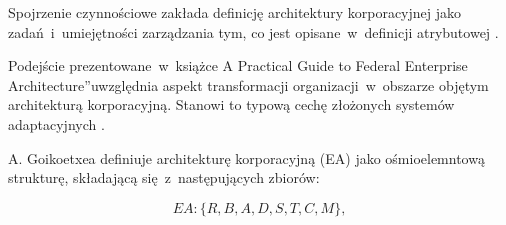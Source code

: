 Spojrzenie czynnościowe zakłada definicję architektury korporacyjnej jako zadań~i~umiejętności zarządzania tym, co jest opisane~w~definicji atrybutowej \cite{ArchKorpSzymSup}.

Podejście prezentowane~w~książce \quotedblbase A Practical Guide to Federal Enterprise Architecture\textquotedblright uwzględnia aspekt transformacji organizacji~w~obszarze objętym architekturą korporacyjną. Stanowi to typową cechę złożonych systemów adaptacyjnych \cite{ArchKorpSob}.

A. Goikoetxea definiuje architekturę korporacyjną (EA) jako ośmioelemntową strukturę, składającą się~z~następujących zbiorów:

\begin{center}
\begin{equation}EA: \{R, B, A, D, S, T, C, M\},\end{equation}
\end{center}

